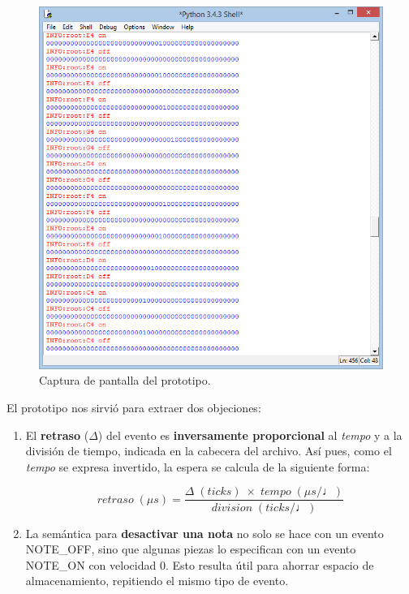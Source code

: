 \begin{figure}[H]
	\noindent \begin{centering}
		\includegraphics[width=\linewidth/2]{capitulo5/cap_pytest}
		\par\end{centering}
	\smallskip
	\caption{\label{fig:cap_pytest} Captura de pantalla del prototipo.}
\end{figure}

\smallskip

El prototipo nos sirvió para extraer dos objeciones:

\begin{enumerate}
	\item El \textbf{retraso} ($\Delta$) del evento es \textbf{inversamente proporcional} al \textit{tempo} y a la división de tiempo, indicada en la cabecera del archivo. Así pues, como el \textit{tempo} se expresa invertido, la espera se calcula de la siguiente forma:
	
	\begin{equation}
		retraso \; (\mu s)  = \frac{\Delta \; (ticks) \; \times \; tempo \; (\mu s / \quarternote)}{division \; (ticks / \quarternote)}
	\end{equation}
	
	\item La semántica para \textbf{desactivar una nota} no solo se hace con un evento NOTE\_OFF, sino que algunas piezas lo especifican con un evento NOTE\_ON con velocidad 0. Esto resulta útil para ahorrar espacio de almacenamiento, repitiendo el mismo tipo de evento.
\end{enumerate}

